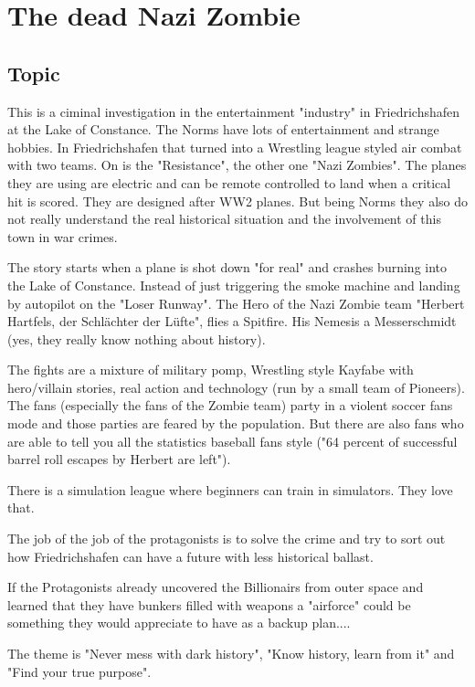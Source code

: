 \chapter{The dead Nazi Zombie}
\label{ch:The Dead Nazi Zombie}

\section{Topic}

This is a ciminal investigation in the entertainment "industry" in Friedrichshafen at the Lake of Constance.
The Norms have lots of entertainment and strange hobbies. In Friedrichshafen that turned into a Wrestling league styled air combat with two teams. On is the "Resistance", the other one "Nazi Zombies".
The planes they are using are electric and can be remote controlled to land when a critical hit is scored. They are designed after WW2 planes.
But being Norms they also do not really understand the real historical situation and the involvement of this town in war crimes.

The story starts when a plane is shot down "for real" and crashes burning into the Lake of Constance. Instead of just triggering the smoke machine and landing by autopilot on the "Loser Runway".
The Hero of the Nazi Zombie team "Herbert Hartfels, der Schlächter der Lüfte", flies a Spitfire.
His Nemesis a Messerschmidt (yes, they really know nothing about history).

The fights are a mixture of military pomp, Wrestling style Kayfabe with hero/villain stories, real action and technology (run by a small team of Pioneers).
The fans (especially the fans of the Zombie team) party in a violent soccer fans mode and those parties are feared by the population. But there are also fans who are able to tell you all the statistics baseball fans style ("64 percent of successful barrel roll escapes by Herbert are left").

There is a simulation league where beginners can train in simulators. They love that.

The job of the job of the protagonists is to solve the crime and try to sort out how Friedrichshafen can have a future with less historical ballast.

If the Protagonists already uncovered the Billionairs from outer space and learned that they have bunkers filled with weapons a "airforce" could be something they would appreciate to have as a backup plan....

The theme is "Never mess with dark history", "Know history, learn from it" and "Find your true purpose".

